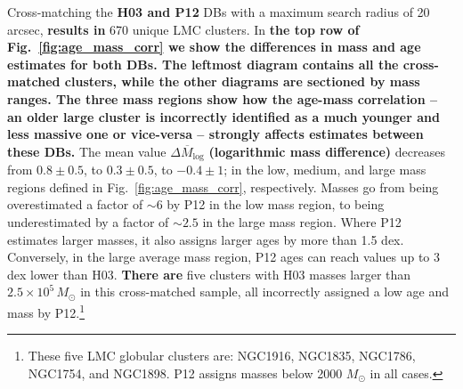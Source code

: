 \documentclass{aa}
\begin{document}
Cross-matching the \textbf{H03 and P12} DBs with a maximum search radius of 20
arcsec, \textbf{results in} 670 unique LMC clusters.
In \textbf{the top row of Fig.~\ref{fig:age_mass_corr} we show the differences
in mass and age estimates for both DBs. The leftmost diagram contains all the
cross-matched clusters, while the other diagrams are sectioned by mass
ranges. The three mass regions show how the age-mass correlation -- an older
large cluster is incorrectly identified as a much younger and less massive one
or vice-versa -- strongly affects estimates between these DBs.\@}
%
The mean value $\overline{\Delta M_{\log}}$ \textbf{(logarithmic mass difference)}
decreases from $0.8{\pm}0.5$, to $0.3{\pm}0.5$, to $-0.4{\pm}1$; in the
low, medium, and large mass regions defined in
Fig.~\ref{fig:age_mass_corr}, respectively. Masses go from being overestimated a
factor of ${\sim}6$ by P12 in the low mass region, to being underestimated by a
factor of ${\sim}2.5$ in the large mass region.
%
Where P12 estimates larger masses, it also assigns larger ages by more than 1.5
dex. Conversely, in the large average mass region, P12 ages can reach
values up to 3 dex lower than H03.
%
\textbf{There are} five clusters with H03 masses larger than
$2.5{\times}10^5\,M_{\odot}$ in this cross-matched sample, all incorrectly
assigned a low age and mass by P12.\footnote{These five LMC globular clusters
are: NGC1916, NGC1835, NGC1786, NGC1754, and NGC1898. P12 assigns masses below
2000 $M_{\odot}$ in all cases.}
%
\end{document}
